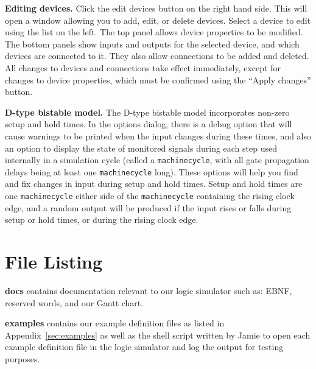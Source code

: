 \documentclass[a4paper,10pt]{article}
\begin{document}
\textbf{Editing devices.} Click the edit devices button on the right hand side. This will open a window allowing you to add, edit, or delete devices. Select a device to edit using the list on the left. The top panel allows device properties to be modified. The bottom panels show inputs and outputs for the selected device, and which devices are connected to it. They also allow connections to be added and deleted. All changes to devices and connections take effect immediately, except for changes to device properties, which must be confirmed using the ``Apply changes'' button. 

\textbf{D-type bistable model.} The D-type bistable model incorporates non-zero setup and hold times. In the options dialog, there is a debug option that will cause warnings to be printed when the input changes during these times, and also an option to display the state of monitored signals during each step used internally in a simulation cycle (called a \texttt{machinecycle}, with all gate propagation delays being at least one \texttt{machinecycle} long). These options will help you find and fix changes in input during setup and hold times. Setup and hold times are one \texttt{machinecycle} either side of the \texttt{machinecycle} containing the rising clock edge, and a random output will be produced if the input rises or falls during setup or hold times, or during the rising clock edge. 

\clearpage
\section{File Listing}


\setlength{\DTbaselineskip}{15pt}
\DTsetlength{.2em}{3em}{0.1em}{1pt}{4pt}

\textbf{docs} contains documentation relevant to our logic simulator such as: EBNF, reserved words, and our Gantt chart.

\textbf{examples} contains our example definition files as listed in Appendix~\ref{sec:examples} as well as the shell script written by Jamie to open each example definition file in the logic simulator and log the output for testing purposes.
\end{document}
